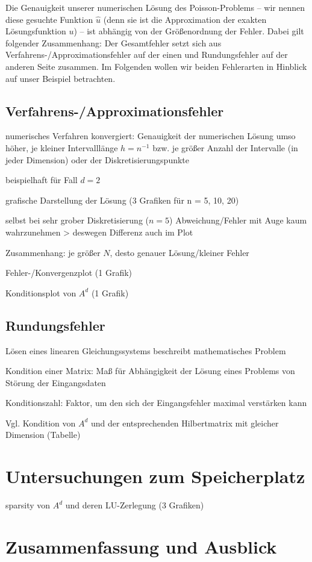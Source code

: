 \documentclass{scrartcl}
\begin{document}
Die Genauigkeit unserer numerischen Lösung des Poisson-Problems -- wir nennen diese gesuchte Funktion $\hat{u}$ (denn sie ist die Approximation der exakten Lösungsfunktion $u$) -- ist abhängig von der Größenordnung der Fehler. Dabei gilt folgender Zusammenhang: Der Gesamtfehler setzt sich aus Verfahrens-/Approximationsfehler auf der einen und Rundungsfehler auf der anderen Seite zusammen. Im Folgenden wollen wir beiden Fehlerarten in Hinblick auf unser Beispiel betrachten.

\subsection{Verfahrens-/Approximationsfehler}
numerisches Verfahren konvergiert: Genauigkeit der numerischen Lösung umso höher, je kleiner Intervalllänge $h=n^{-1}$ bzw. je größer Anzahl der Intervalle (in jeder Dimension) oder der Diskretisierungspunkte

beispielhaft für Fall $d=2$

grafische Darstellung der Lösung (3 Grafiken für n = 5, 10, 20)

selbst bei sehr grober Diskretisierung ($n=5$) Abweichung/Fehler mit Auge kaum wahrzunehmen > deswegen Differenz auch im Plot

Zusammenhang: je größer $N$, desto genauer Lösung/kleiner Fehler

Fehler-/Konvergenzplot (1 Grafik)

Konditionsplot von $A^d$ (1 Grafik)

\subsection{Rundungsfehler}
Lösen eines linearen Gleichungssystems beschreibt mathematisches Problem

Kondition einer Matrix: Maß für Abhängigkeit der Lösung eines Problems von Störung der Eingangsdaten

Konditionszahl: Faktor, um den sich der Eingangsfehler maximal verstärken kann 

Vgl. Kondition von $A^d$ und der entsprechenden Hilbertmatrix mit gleicher Dimension (Tabelle)

\pagebreak
\section{Untersuchungen zum Speicherplatz}
sparsity von $A^d$ und deren LU-Zerlegung (3 Grafiken)

\pagebreak
\section{Zusammenfassung und Ausblick}


\pagebreak



\end{document}
